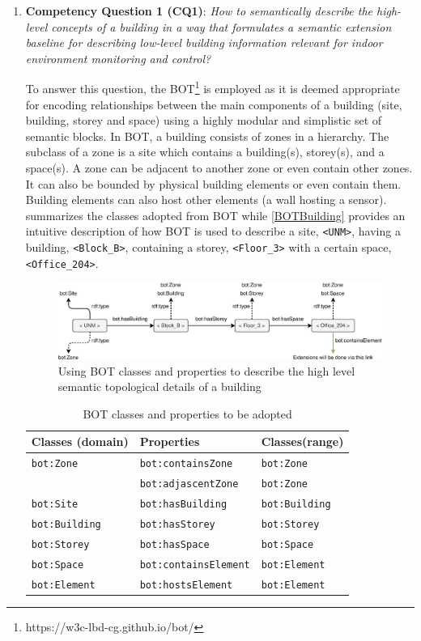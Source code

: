 \begin{enumerate}
\item 
\textbf{Competency Question 1 (CQ1)}: \textit{How to semantically describe the high-level concepts of a building in a way that formulates a semantic extension baseline for describing low-level building information relevant for indoor environment monitoring and control?}

 To answer this question, the \acf{BOT}\footnote{https://w3c-lbd-cg.github.io/bot/} \citep{Rasmussen2017} is employed as it is deemed appropriate for encoding relationships between the main components of a building (site, building, storey and space) using a highly modular and simplistic set of semantic blocks. In \ac{BOT}, a building consists of zones in a hierarchy. The subclass of a zone is a site which contains a building(s), storey(s), and a space(s). A zone can be adjacent to another zone or even contain other zones. It can also be bounded by physical building elements or even contain them. Building elements can also host other elements (a wall hosting a sensor).  summarizes the classes adopted from \ac{BOT} while \autoref{BOTBuilding} provides an intuitive description of how \ac{BOT} is used to describe a site, \texttt{<UNM>}, having a building, \texttt{<Block\_B>}, containing a storey, \texttt{<Floor\_3>} with a certain space, \texttt{<Office\_204>}.
 \begin{figure}[b]
    \centering
    \includegraphics[width=1.0\textwidth]{figures/BOT.eps}
    \caption{Using BOT classes and properties to describe the high level semantic topological details of a building} \label{BOTBuilding}
\end{figure}
\begin{table}[t]
	\centering
 \caption{BOT classes and properties to be adopted}
	\begin{tabular}{l|l|l}
		\hline \hline
		Classes (domain) & Properties & Classes(range) \bigstrut \\ \hline
		\texttt{bot:Zone} & \texttt{bot:containsZone} & \texttt{bot:Zone} \bigstrut \\
		& \texttt{bot:adjascentZone} & \texttt{bot:Zone} \bigstrut \\
		\texttt{bot:Site} & \texttt{bot:hasBuilding} & \texttt{bot:Building} \bigstrut \\
		\texttt{bot:Building} & \texttt{bot:hasStorey} & \texttt{bot:Storey} \bigstrut \\
		\texttt{bot:Storey} & \texttt{bot:hasSpace} & \texttt{bot:Space} \bigstrut \\
		\texttt{bot:Space} & \texttt{bot:containsElement} & \texttt{bot:Element} \bigstrut \\
		\texttt{bot:Element} & \texttt{bot:hostsElement} & \texttt{bot:Element} \bigstrut \\
	\end{tabular}
	

\end{table}
\end{enumerate}
